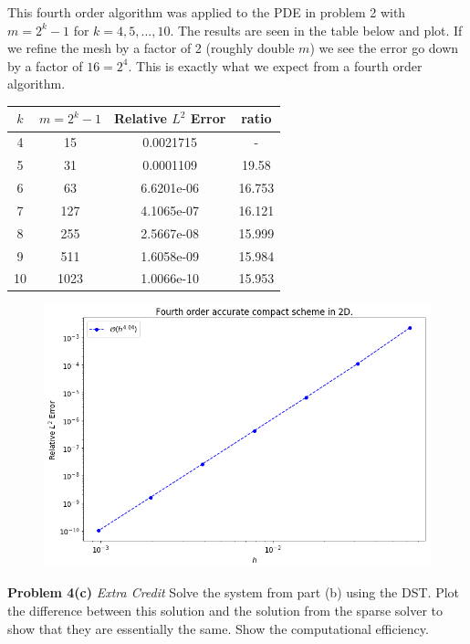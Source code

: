 \documentclass[12pt]{article}
\newcommand{\problem}[1]{\hspace{-4 ex} \large \textbf{Problem #1} }
\begin{document}
This fourth order algorithm was applied to the PDE in problem 2 with $m=2^k-1$ for $k=4, 5, ..., 10$. The results are seen in the table below and plot. If we refine the mesh by a factor of 2 (roughly double $m$) we see the error go down by a factor of $16=2^4$. This is exactly what we expect from a fourth order algorithm.

\begin{center}
	\begin{tabular}{|c|c|c|c|}
		\hline
		$k$&$m=2^k-1$&Relative $L^2$ Error&ratio\\ \hline
		4&15&0.0021715&-\\ \hline
		5&31&0.0001109&19.58\\ \hline
		6&63&6.6201e-06&16.753\\ \hline
		7&127&4.1065e-07&16.121\\ \hline
		8&255&2.5667e-08&15.999\\ \hline
		9&511&1.6058e-09&15.984\\ \hline
		10&1023&1.0066e-10&15.953\\ \hline
	\end{tabular}
\end{center}

\begin{figure}[H]
	\centering
	\includegraphics[width=1\linewidth]{hw4_p4_convergence}
\end{figure}

\bigbreak
\problem{4(c)} \textit{Extra Credit} Solve the system from part (b) using the DST. Plot the difference between this solution and the solution from the sparse solver to show that they are essentially the same. Show the computational efficiency. \bigbreak
\end{document}
